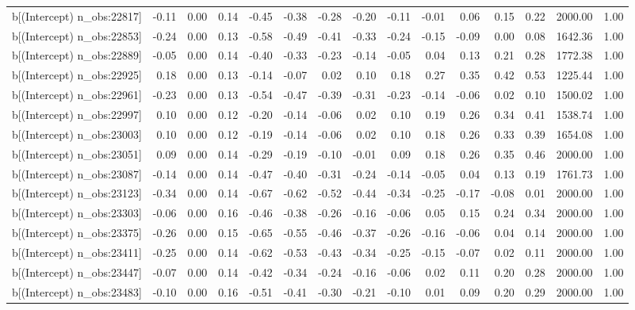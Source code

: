 \begin{table}[ht]
\begin{tabular}{rrrrrrrrrrrrrrr}
  b[(Intercept) n\_obs:22817] & -0.11 & 0.00 & 0.14 & -0.45 & -0.38 & -0.28 & -0.20 & -0.11 & -0.01 & 0.06 & 0.15 & 0.22 & 2000.00 & 1.00 \\ 
  b[(Intercept) n\_obs:22853] & -0.24 & 0.00 & 0.13 & -0.58 & -0.49 & -0.41 & -0.33 & -0.24 & -0.15 & -0.09 & 0.00 & 0.08 & 1642.36 & 1.00 \\ 
  b[(Intercept) n\_obs:22889] & -0.05 & 0.00 & 0.14 & -0.40 & -0.33 & -0.23 & -0.14 & -0.05 & 0.04 & 0.13 & 0.21 & 0.28 & 1772.38 & 1.00 \\ 
  b[(Intercept) n\_obs:22925] & 0.18 & 0.00 & 0.13 & -0.14 & -0.07 & 0.02 & 0.10 & 0.18 & 0.27 & 0.35 & 0.42 & 0.53 & 1225.44 & 1.00 \\ 
  b[(Intercept) n\_obs:22961] & -0.23 & 0.00 & 0.13 & -0.54 & -0.47 & -0.39 & -0.31 & -0.23 & -0.14 & -0.06 & 0.02 & 0.10 & 1500.02 & 1.00 \\ 
  b[(Intercept) n\_obs:22997] & 0.10 & 0.00 & 0.12 & -0.20 & -0.14 & -0.06 & 0.02 & 0.10 & 0.19 & 0.26 & 0.34 & 0.41 & 1538.74 & 1.00 \\ 
  b[(Intercept) n\_obs:23003] & 0.10 & 0.00 & 0.12 & -0.19 & -0.14 & -0.06 & 0.02 & 0.10 & 0.18 & 0.26 & 0.33 & 0.39 & 1654.08 & 1.00 \\ 
  b[(Intercept) n\_obs:23051] & 0.09 & 0.00 & 0.14 & -0.29 & -0.19 & -0.10 & -0.01 & 0.09 & 0.18 & 0.26 & 0.35 & 0.46 & 2000.00 & 1.00 \\ 
  b[(Intercept) n\_obs:23087] & -0.14 & 0.00 & 0.14 & -0.47 & -0.40 & -0.31 & -0.24 & -0.14 & -0.05 & 0.04 & 0.13 & 0.19 & 1761.73 & 1.00 \\ 
  b[(Intercept) n\_obs:23123] & -0.34 & 0.00 & 0.14 & -0.67 & -0.62 & -0.52 & -0.44 & -0.34 & -0.25 & -0.17 & -0.08 & 0.01 & 2000.00 & 1.00 \\ 
  b[(Intercept) n\_obs:23303] & -0.06 & 0.00 & 0.16 & -0.46 & -0.38 & -0.26 & -0.16 & -0.06 & 0.05 & 0.15 & 0.24 & 0.34 & 2000.00 & 1.00 \\ 
  b[(Intercept) n\_obs:23375] & -0.26 & 0.00 & 0.15 & -0.65 & -0.55 & -0.46 & -0.37 & -0.26 & -0.16 & -0.06 & 0.04 & 0.14 & 2000.00 & 1.00 \\ 
  b[(Intercept) n\_obs:23411] & -0.25 & 0.00 & 0.14 & -0.62 & -0.53 & -0.43 & -0.34 & -0.25 & -0.15 & -0.07 & 0.02 & 0.11 & 2000.00 & 1.00 \\ 
  b[(Intercept) n\_obs:23447] & -0.07 & 0.00 & 0.14 & -0.42 & -0.34 & -0.24 & -0.16 & -0.06 & 0.02 & 0.11 & 0.20 & 0.28 & 2000.00 & 1.00 \\ 
  b[(Intercept) n\_obs:23483] & -0.10 & 0.00 & 0.16 & -0.51 & -0.41 & -0.30 & -0.21 & -0.10 & 0.01 & 0.09 & 0.20 & 0.29 & 2000.00 & 1.00 \\ 

\end{tabular}
\end{table}
